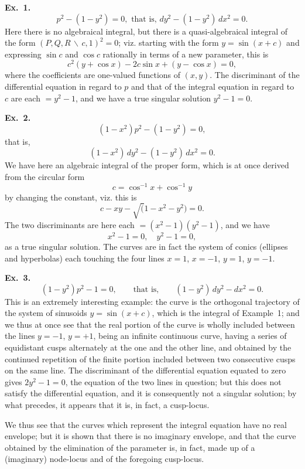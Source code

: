 \documentclass[11pt,a4paper]{book}
\begin{document}
\medskip\noindent\textbf{Ex.~1.}
\[
p^2 - (1 - y^2) = 0, \text{ that is, } dy^2 - (1-y^2)\, dx^2 = 0.
\]
Here there is no algebraical integral, but there is a quasi-algebraical integral of the form $(P, Q, R \,\backslash\, c, 1)^2 = 0$; viz. starting with the form $y = \sin(x+c)$ and expressing $\sin c$ and $\cos c$ rationally in terms of a new parameter, this is
\[
c^2(y + \cos x) - 2c\sin x + (y - \cos x) = 0,
\]
where the coefficients are one-valued functions of $(x, y)$. The discriminant of the differential equation in regard to $p$ and that of the integral equation in regard to $c$ are each $= y^2 - 1$, and we have a true singular solution $y^2 - 1 = 0$.

\medskip\noindent\textbf{Ex.~2.}
\[
(1-x^2)p^2 - (1-y^2) = 0,
\]
that is,
\[
(1-x^2)\, dy^2 - (1-y^2)\, dx^2 = 0.
\]
We have here an algebraic integral of the proper form, which is at once derived from the circular form
\[
c = \cos^{-1} x + \cos^{-1} y
\]
by changing the constant, viz. this is
\[
c - xy - \surd(1-x^2-y^2) = 0.
\]
The two discriminants are here each $= (x^2-1)(y^2-1)$, and we have
\[
x^2 - 1 = 0, \quad y^2 - 1 = 0,
\]
as a true singular solution. The curves are in fact the system of conics (ellipses and hyperbolas) each touching the four lines $x = 1$, $x = -1$, $y = 1$, $y = -1$.

\medskip\noindent\textbf{Ex.~3.}
\[
(1-y^2)p^2 - 1 = 0, \qquad \text{that is,} \qquad (1-y^2)\, dy^2 - dx^2 = 0.
\]
This is an extremely interesting example: the curve is the orthogonal trajectory of the system of sinusoids $y = \sin(x+c)$, which is the integral of Example~1; and we thus at once see that the real portion of the curve is wholly included between the lines $y = -1$, $y = +1$, being an infinite continuous curve, having a series of equidistant cusps alternately at the one and the other line, and obtained by the continued repetition of the finite portion included between two consecutive cusps on the same line. The discriminant of the differential equation equated to zero gives $2y^2 - 1 = 0$, the equation of the two lines in question; but this does not satisfy the differential equation, and it is consequently not a singular solution; by what precedes, it appears that it is, in fact, a cusp-locus.

We thus see that the curves which represent the integral equation have no real envelope; but it is shown that there is no imaginary envelope, and that the curve obtained by the elimination of the parameter is, in fact, made up of a (imaginary) node-locus and of the foregoing cusp-locus.
\end{document}
